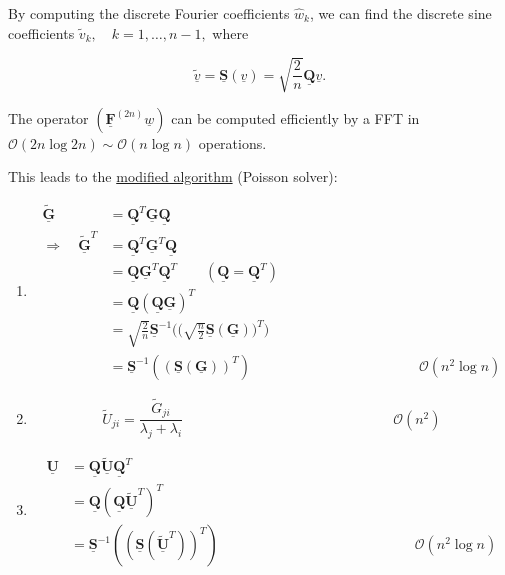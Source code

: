 \documentclass[11pt]{article}
\begin{document}
By computing the discrete Fourier coefficients $\hat{w}_k$, we can find the discrete sine coefficients $\widetilde{v}_k, \quad k=1,\ldots,n-1,$ where

\begin{equation*}
  \underline{\widetilde{v}}=\underline{\mathbf{S}}(\underline{v}) = \sqrt{\frac{2}{n}} \underline{\mathbf{Q}} \underline{v}.
\end{equation*}

The operator $(\underline{\mathbf{F}}^{(2n)} \underline{w})$ can be computed efficiently by a FFT in $\mathcal{O}(2n \log 2n) \sim \mathcal{O} (n \log n)$ operations.

This leads to the \underline{modified algorithm} (Poisson solver):

\renewcommand{\theenumi}{\arabic{enumi}}
\renewcommand{\labelenumi}{\textbf{\theenumi)}}
\begin{enumerate}
  \item
    \begin{align*}
      \underline{\widetilde{\mathbf{G}}} &= \underline{\mathbf{Q}}^T \underline{\mathbf{G}} \underline{\mathbf{Q}} \\
      \Rightarrow \quad \underline{\widetilde{\mathbf{G}}}^T &= \underline{\mathbf{Q}}^T \underline{\mathbf{G}}^T \underline{\mathbf{Q}} \\
      &= \underline{\mathbf{Q}} \underline{\mathbf{G}}^T \underline{\mathbf{Q}}^T \qquad (\underline{\mathbf{Q}}=\underline{\mathbf{Q}}^T) \\
      &= \underline{\mathbf{Q}} (\underline{\mathbf{Q}} \underline{\mathbf{G}})^T \\
      &= \sqrt{\frac{2}{n}} \underline{\mathbf{S}}^{-1} \biggl( \biggl( \sqrt{\frac{n}{2}} \underline{\mathbf{S}}( \underline{\mathbf{G}}) \biggr)^T \biggr) \\
      &= \underline{\mathbf{S}}^{-1} ((\underline{\mathbf{S}} (\underline{\mathbf{G}}))^T) \qquad \qquad \qquad \qquad \qquad \qquad \mathcal{O}(n^2 \log n)
    \end{align*}

  \item
    \begin{equation*}
      \widetilde{U}_{ji} = \frac{\widetilde{G}_{ji}}{\lambda_j+\lambda_i} \qquad \qquad \qquad \qquad \qquad \qquad \qquad \quad \mathcal{O}(n^2)
    \end{equation*}

  \item
    \begin{align*}
      \underline{\mathbf{U}} &= \underline{\mathbf{Q}} \underline{\mathbf{\widetilde{U}}} \underline{\mathbf{Q}}^T \\
      &= \underline{\mathbf{Q}} ( \underline{\mathbf{Q}} \underline{\mathbf{\widetilde{U}}}^T)^T \\
      &= \underline{\mathbf{S}}^{-1}((\underline{\mathbf{S}}(\underline{\mathbf{\widetilde{U}}}^T))^T) \qquad \qquad \qquad \qquad \qquad \qquad \qquad \mathcal{O}(n^2 \log n)
    \end{align*}
\end{enumerate}
\end{document}
